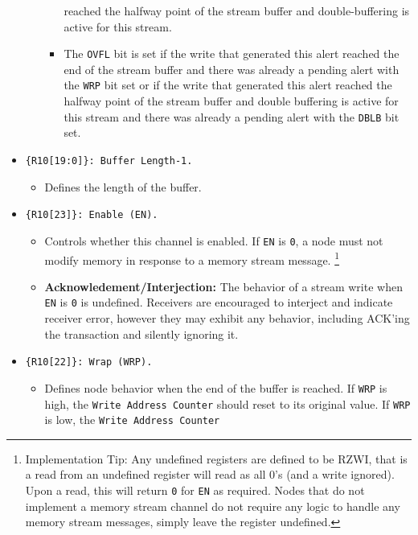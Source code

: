 \begin{itemize}
\begin{itemize}
\begin{itemize}
          reached the halfway point of the stream buffer and double-buffering
          is active for this stream.
        \item The {\tt OVFL} bit is set if the write that generated this alert
          reached the end of the stream buffer and there was already a pending
          alert with the {\tt WRP} bit set or if the write that generated this
          alert reached the halfway point of the stream buffer and double
          buffering is active for this stream and there was already a pending
          alert with the {\tt DBLB} bit set.
      \end{itemize}
    \end{itemize}
  \item {\tt \{R10[19:0]\}: Buffer Length-1.}
    \begin{itemize}
      \item Defines the length of the buffer.
    \end{itemize}
  \item {\tt \{R10[23]\}: Enable (EN).}
    \begin{itemize}
      \item Controls whether this channel is enabled. If {\tt EN} is {\tt 0},
        a node must not modify memory in response to a memory stream message.%
        \footnote{
          Implementation Tip: Any undefined \proto registers are defined to be
          RZWI, that is a read from an undefined register will read as all 0's
          (and a write ignored). Upon a read, this will return {\tt 0} for
          {\tt EN} as required.  Nodes that do not implement a memory stream
          channel do not require any logic to handle any memory stream
          messages, simply leave the register undefined.
        }
      \item {\bf Acknowledement/Interjection:} The behavior of a stream write
        when {\tt EN} is {\tt 0} is undefined. Receivers are encouraged to
        interject and indicate receiver error, however they may exhibit any
        behavior, including ACK'ing the transaction and silently ignoring it.
    \end{itemize}
  \item {\tt \{R10[22]\}: Wrap (WRP).}
    \begin{itemize}
      \item Defines node behavior when the end of the buffer is reached. If
        {\tt WRP} is high, the {\tt Write Address Counter} should reset to its
        original value. If {\tt WRP} is low, the {\tt Write Address Counter}

\end{itemize}
\end{itemize}
